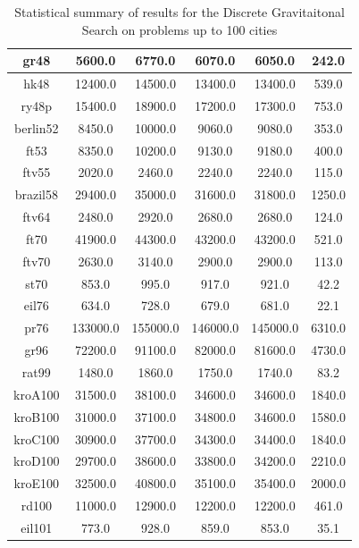 \documentclass{article}
\begin{document}
\begin{table}[h!]
{\begin{tabular}{|c||c|c|c|c|c|}
            \hline
            gr48 & 5600.0 & 6770.0 & 6070.0 & 6050.0 & 242.0 \\
            \hline
            hk48 & 12400.0 & 14500.0 & 13400.0 & 13400.0 & 539.0 \\
            \hline
            ry48p & 15400.0 & 18900.0 & 17200.0 & 17300.0 & 753.0 \\
            \hline
            berlin52 & 8450.0 & 10000.0 & 9060.0 & 9080.0 & 353.0 \\
            \hline
            ft53 & 8350.0 & 10200.0 & 9130.0 & 9180.0 & 400.0 \\
            \hline
            ftv55 & 2020.0 & 2460.0 & 2240.0 & 2240.0 & 115.0 \\
            \hline
            brazil58 & 29400.0 & 35000.0 & 31600.0 & 31800.0 & 1250.0 \\
            \hline
            ftv64 & 2480.0 & 2920.0 & 2680.0 & 2680.0 & 124.0 \\
            \hline
            ft70 & 41900.0 & 44300.0 & 43200.0 & 43200.0 & 521.0 \\
            \hline
            ftv70 & 2630.0 & 3140.0 & 2900.0 & 2900.0 & 113.0 \\
            \hline
            st70 & 853.0 & 995.0 & 917.0 & 921.0 & 42.2 \\
            \hline
            eil76 & 634.0 & 728.0 & 679.0 & 681.0 & 22.1 \\
            \hline
            pr76 & 133000.0 & 155000.0 & 146000.0 & 145000.0 & 6310.0 \\
            \hline
            gr96 & 72200.0 & 91100.0 & 82000.0 & 81600.0 & 4730.0 \\
            \hline
            rat99 & 1480.0 & 1860.0 & 1750.0 & 1740.0 & 83.2 \\
            \hline
            kroA100 & 31500.0 & 38100.0 & 34600.0 & 34600.0 & 1840.0 \\
            \hline
            kroB100 & 31000.0 & 37100.0 & 34800.0 & 34600.0 & 1580.0 \\
            \hline
            kroC100 & 30900.0 & 37700.0 & 34300.0 & 34400.0 & 1840.0 \\
            \hline
            kroD100 & 29700.0 & 38600.0 & 33800.0 & 34200.0 & 2210.0 \\
            \hline
            kroE100 & 32500.0 & 40800.0 & 35100.0 & 35400.0 & 2000.0 \\
            \hline
            rd100 & 11000.0 & 12900.0 & 12200.0 & 12200.0 & 461.0 \\
            \hline
            eil101 & 773.0 & 928.0 & 859.0 & 853.0 & 35.1 \\
            \hline
        \end{tabular}
        }
        \caption{Statistical summary of results for the Discrete Gravitaitonal Search on problems up to 100 cities}
    \end{table}
\end{document}
